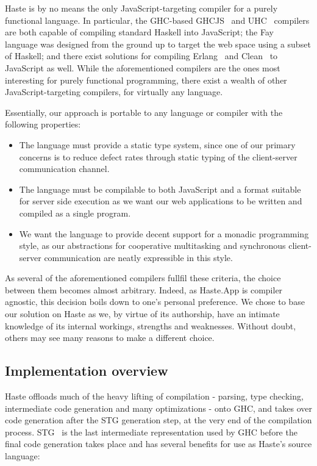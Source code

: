 \documentclass[preprint]{sigplanconf}
\begin{document}
Haste is by no means the only JavaScript-targeting compiler for a purely
functional language. In particular, the GHC-based GHCJS\ \cite{ghcjs} and
UHC\ \cite{uhc} compilers are both capable of compiling standard Haskell into
JavaScript; the Fay\ \cite{fay} language was designed from the ground up to
target the web space using a subset of Haskell; and there exist solutions for
compiling Erlang\ \cite{jserlang} and Clean\ \cite{jsclean} to JavaScript as
well. While the aforementioned compilers are the ones most interesting for
purely functional programming, there exist a wealth of other
JavaScript-targeting compilers, for virtually any language.

Essentially, our approach is portable to any language or compiler with the
following properties:

\begin{itemize}
  \item The language must provide a static type system, since one of our
        primary concerns is to reduce defect rates through static typing of
        the client-server communication channel.
  \item The language must be compilable to both JavaScript and a format
        suitable for server side execution as we want our web applications
        to be written and compiled as a single program.
  \item We want the language to provide decent support for a monadic
        programming style, as our abstractions for cooperative multitasking
        and synchronous client-server communication are neatly expressible in
        this style.
\end{itemize}

As several of the aforementioned compilers fullfil these criteria, the
choice between them becomes almost arbitrary. Indeed, as Haste.App is compiler
agnostic, this decision boils down to one's personal preference. We chose to
base our solution on Haste as we, by virtue of its authorship, have an intimate
knowledge of its internal workings, strengths and weaknesses.
Without doubt, others may see many reasons to make a different choice.

\subsection{Implementation overview}

Haste offloads much of the heavy lifting of compilation - parsing,
type checking, intermediate code generation and many optimizations - onto GHC,
and takes over code generation after the STG generation step, at the very end
of the compilation process. STG\ \cite{stg} is the last intermediate
representation used by GHC before the final code generation takes place and
has several benefits for use as Haste's source language:
\end{document}
